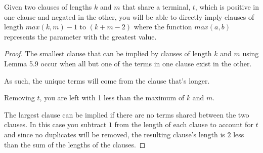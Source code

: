 \documentclass[manuscript]{acmart}
\begin{document}
    \begin{lemma}
        Given two clauses of lengths $k$ and $m$ that share a terminal, $t$, which is 
        positive in one clause and negated in the other, you will be able
        to directly imply clauses of length $max(k, m)-1$ to $(k + m - 2)$ where
        the function $max(a, b)$ represents the parameter with the greatest value.
    \end{lemma}
    \begin{proof}
        The smallest clause that can be implied by clauses of length $k$ and $m$
        using Lemma 5.9 occur when all but one of the terms in one clause exist in the other.

        As such, the unique terms will come from the clause that's longer.

        Removing $t$, you are left with 1 less than the maximum of $k$ and $m$.

        The largest clause can be implied if there are no terms shared between
        the two clauses. In this case you subtract $1$ from the length of each
        clause to account for $t$ and since no duplicates will be removed, the 
        resulting clause's length is $2$ less than the sum of the lengths of 
        the clauses.
    \end{proof}
\end{document}
